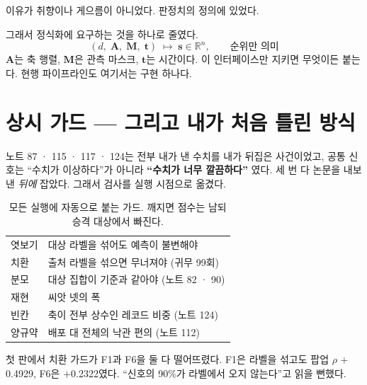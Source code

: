 \documentclass[10pt]{article}
\begin{document}
이유가 취향이나 게으름이 아니었다. 판정치의 정의에 있었다.


그래서 정식화에 요구하는 것을 하나로 줄였다.
\[
  (d,\; \mathbf{A},\; \mathbf{M},\; \mathbf{t}) \;\longmapsto\; \mathbf{s}\in\mathbb{R}^{n},
  \qquad \text{순위만 의미}
\]
$\mathbf{A}$는 축 행렬, $\mathbf{M}$은 관측 마스크, $\mathbf{t}$는 시간이다.
이 인터페이스만 지키면 무엇이든 붙는다. 현행 파이프라인도 여기서는 구현 하나다.

\section{상시 가드 --- 그리고 내가 처음 틀린 방식}

노트 87 · 115 · 117 · 124는 전부 내가 낸 수치를 내가 뒤집은 사건이었고,
공통 신호는 ``수치가 이상하다''가 아니라 \textbf{``수치가 너무 깔끔하다''}
였다. 세 번 다 논문을 내보낸 \emph{뒤에} 잡았다. 그래서 검사를 실행 시점으로
옮겼다.

\begin{table}[t]
\centering\tsize
\caption{모든 실행에 자동으로 붙는 가드. 깨지면 점수는 남되 승격 대상에서 빠진다.}
\begin{tabular}{ll}
\toprule
엿보기 & 대상 라벨을 섞어도 예측이 불변해야 \\
치환 & 출처 라벨을 섞으면 무너져야 (귀무 99회) \\
분모 & 대상 집합이 기준과 같아야 (노트 82 · 90) \\
재현 & 씨앗 넷의 폭 \\
빈칸 & 축이 전부 상수인 레코드 비중 (노트 124) \\
양규약 & 배포 대 전체의 낙관 편의 (노트 112) \\
\bottomrule
\end{tabular}
\end{table}

첫 판에서 치환 가드가 F1과 F6을 둘 다 떨어뜨렸다. F1은 라벨을 섞고도 팝업
$\rho$ $+$0.4929, F6은 $+$0.2322였다. ``신호의 90\%가 라벨에서 오지
않는다''고 읽을 뻔했다.

\end{document}
